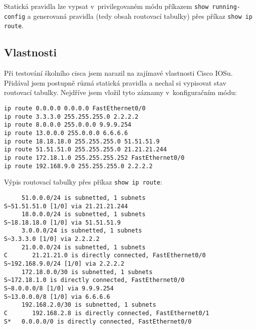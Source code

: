 Statická pravidla lze vypsat v~privilegovaném módu příkazem \verb|show running-config| a generovaná pravidla (tedy obsah routovací tabulky) přes příkaz \verb|show ip route|.

\subsection{Vlastnosti}
Při testování školního cisca jsem narazil na zajímavé vlastnosti Cisco IOSu. Přidával jsem postupně různá statická pravidla a nechal si vypisovat stav routovací tabulky.
Nejdříve jsem vložil tyto záznamy v~konfiguračním módu:
\begin{verbatim}
ip route 0.0.0.0 0.0.0.0 FastEthernet0/0
ip route 3.3.3.0 255.255.255.0 2.2.2.2
ip route 8.0.0.0 255.0.0.0 9.9.9.254
ip route 13.0.0.0 255.0.0.0 6.6.6.6
ip route 18.18.18.0 255.255.255.0 51.51.51.9
ip route 51.51.51.0 255.255.255.0 21.21.21.244
ip route 172.18.1.0 255.255.255.252 FastEthernet0/0
ip route 192.168.9.0 255.255.255.0 2.2.2.2
\end{verbatim}

Výpis routovací tabulky přes příkaz \verb|show ip route|:
\begin{verbatim}
     51.0.0.0/24 is subnetted, 1 subnets
S~51.51.51.0 [1/0] via 21.21.21.244
     18.0.0.0/24 is subnetted, 1 subnets
S~18.18.18.0 [1/0] via 51.51.51.9
     3.0.0.0/24 is subnetted, 1 subnets
S~3.3.3.0 [1/0] via 2.2.2.2
     21.0.0.0/24 is subnetted, 1 subnets
C       21.21.21.0 is directly connected, FastEthernet0/0
S~192.168.9.0/24 [1/0] via 2.2.2.2
     172.18.0.0/30 is subnetted, 1 subnets
S~172.18.1.0 is directly connected, FastEthernet0/0
S~8.0.0.0/8 [1/0] via 9.9.9.254
S~13.0.0.0/8 [1/0] via 6.6.6.6
     192.168.2.0/30 is subnetted, 1 subnets
C       192.168.2.8 is directly connected, FastEthernet0/1
S*   0.0.0.0/0 is directly connected, FastEthernet0/0
\end{verbatim} 

